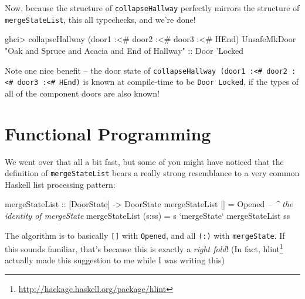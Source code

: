 \documentclass[]{article}
\newenvironment{Shaded}{}{}
\newcommand{\CommentTok}[1]{\textcolor[rgb]{0.38,0.63,0.69}{\textit{#1}}}
\newcommand{\DataTypeTok}[1]{\textcolor[rgb]{0.56,0.13,0.00}{#1}}
\newcommand{\FunctionTok}[1]{\textcolor[rgb]{0.02,0.16,0.49}{#1}}
\newcommand{\NormalTok}[1]{#1}
\newcommand{\OtherTok}[1]{\textcolor[rgb]{0.00,0.44,0.13}{#1}}
\newcommand{\StringTok}[1]{\textcolor[rgb]{0.25,0.44,0.63}{#1}}
\renewcommand{\href}[2]{#2\footnote{\url{#1}}}
\begin{document}
Now, because the structure of \texttt{collapseHallway} perfectly mirrors the
structure of \texttt{mergeStateList}, this all typechecks, and we're done!

\begin{Shaded}
\begin{Highlighting}[]
\NormalTok{ghci}\FunctionTok{>}\NormalTok{ collapseHallway (door1 }\FunctionTok{:<#}\NormalTok{ door2 }\FunctionTok{:<#}\NormalTok{ door3 }\FunctionTok{:<#} \DataTypeTok{HEnd}\NormalTok{)}
\DataTypeTok{UnsafeMkDoor} \StringTok{"Oak and Spruce and Acacia and End of Hallway"}
\OtherTok{    ::} \DataTypeTok{Door}\NormalTok{ '}\DataTypeTok{Locked}
\end{Highlighting}
\end{Shaded}

Note one nice benefit -- the door state of
\texttt{collapseHallway\ (door1\ :\textless{}\#\ door2\ :\textless{}\#\ door3\ :\textless{}\#\ HEnd)}
is known at compile-time to be \texttt{Door\ \textquotesingle{}Locked}, if the
types of all of the component doors are also known!

\hypertarget{functional-programming}{%
\section{Functional Programming}\label{functional-programming}}

We went over that all a bit fast, but some of you might have noticed that the
definition of \texttt{mergeStateList} bears a really strong resemblance to a
very common Haskell list processing pattern:

\begin{Shaded}
\begin{Highlighting}[]
\OtherTok{mergeStateList ::}\NormalTok{ [}\DataTypeTok{DoorState}\NormalTok{] }\OtherTok{->} \DataTypeTok{DoorState}
\NormalTok{mergeStateList []     }\FunctionTok{=} \DataTypeTok{Opened}               \CommentTok{-- ^ the identity of mergeState}
\NormalTok{mergeStateList (s}\FunctionTok{:}\NormalTok{ss) }\FunctionTok{=}\NormalTok{ s }\OtherTok{`mergeState`}\NormalTok{ mergeStateList ss}
\end{Highlighting}
\end{Shaded}

The algorithm is to basically \texttt{{[}{]}} with \texttt{Opened}, and all
\texttt{(:)} with \texttt{mergeState}. If this sounds familiar, that's because
this is exactly a \emph{right fold}! (In fact,
\href{http://hackage.haskell.org/package/hlint}{hlint} actually made this
suggestion to me while I was writing this)
\end{document}
